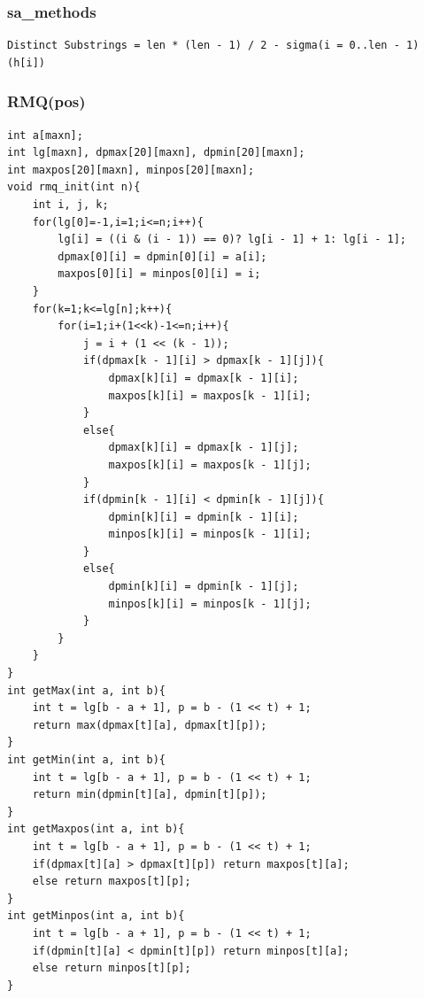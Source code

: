 \documentclass[a4paper]{article}
\begin{document}
\begin{CJK*}{UTF8}{gbsn}
\begin{multicols}{3}
\begin{flushleft}
\subsubsection{sa\_methods}
\begin{lstlisting}
Distinct Substrings = len * (len - 1) / 2 - sigma(i = 0..len - 1)(h[i])
\end{lstlisting}
\subsubsection{RMQ(pos)}
\begin{lstlisting}
int a[maxn];
int lg[maxn], dpmax[20][maxn], dpmin[20][maxn];
int maxpos[20][maxn], minpos[20][maxn];
void rmq_init(int n){
    int i, j, k;
    for(lg[0]=-1,i=1;i<=n;i++){
        lg[i] = ((i & (i - 1)) == 0)? lg[i - 1] + 1: lg[i - 1];
        dpmax[0][i] = dpmin[0][i] = a[i];
        maxpos[0][i] = minpos[0][i] = i;
    }
    for(k=1;k<=lg[n];k++){
        for(i=1;i+(1<<k)-1<=n;i++){
            j = i + (1 << (k - 1));
            if(dpmax[k - 1][i] > dpmax[k - 1][j]){
                dpmax[k][i] = dpmax[k - 1][i];
                maxpos[k][i] = maxpos[k - 1][i];
            }
            else{
                dpmax[k][i] = dpmax[k - 1][j];
                maxpos[k][i] = maxpos[k - 1][j];
            }
            if(dpmin[k - 1][i] < dpmin[k - 1][j]){
                dpmin[k][i] = dpmin[k - 1][i];
                minpos[k][i] = minpos[k - 1][i];
            }
            else{
                dpmin[k][i] = dpmin[k - 1][j];
                minpos[k][i] = minpos[k - 1][j];
            }
        }
    }
}
int getMax(int a, int b){
    int t = lg[b - a + 1], p = b - (1 << t) + 1;
    return max(dpmax[t][a], dpmax[t][p]);
}
int getMin(int a, int b){
    int t = lg[b - a + 1], p = b - (1 << t) + 1;
    return min(dpmin[t][a], dpmin[t][p]);
}
int getMaxpos(int a, int b){
    int t = lg[b - a + 1], p = b - (1 << t) + 1;
    if(dpmax[t][a] > dpmax[t][p]) return maxpos[t][a];
    else return maxpos[t][p];
}
int getMinpos(int a, int b){
    int t = lg[b - a + 1], p = b - (1 << t) + 1;
    if(dpmin[t][a] < dpmin[t][p]) return minpos[t][a];
    else return minpos[t][p];
}
\end{lstlisting}


\end{flushleft}
\end{multicols}
\end{CJK*}
\end{document}
